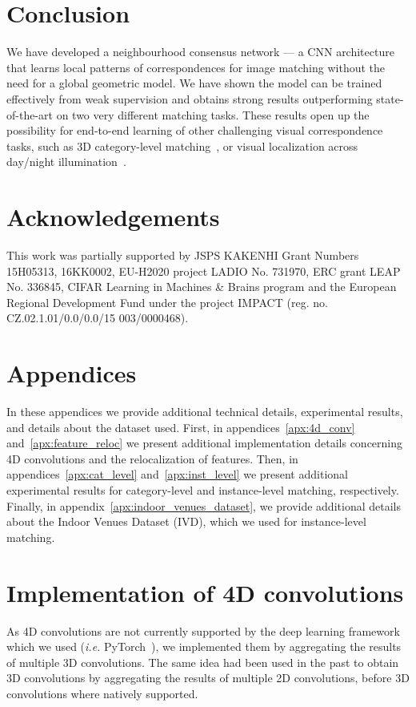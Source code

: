 \documentclass{article}
\begin{document}
\section{Conclusion}
We have developed a neighbourhood consensus network — a CNN architecture  that learns local patterns of correspondences for image matching without the need for a global geometric model. We have shown the model can be trained effectively from weak supervision and obtains strong results outperforming state-of-the-art on two very different matching tasks.  These results open up the possibility for end-to-end learning of other challenging visual correspondence tasks, such as 3D category-level matching~\cite{Kanazawa18}, or visual localization across day/night illumination~\cite{Sattler18}.  

\section*{Acknowledgements}

This work was partially supported by
JSPS KAKENHI Grant Numbers 15H05313, 16KK0002, EU-H2020 project LADIO No. 731970, ERC
grant LEAP No. 336845, CIFAR Learning in Machines
\& Brains program and the European Regional
Development Fund under the project IMPACT (reg.
no. CZ.02.1.01/0.0/0.0/15 003/0000468). 




\clearpage
\appendix
\section*{{\Large Appendices}}
In these appendices we provide additional technical details, experimental results, and details about the dataset used. First, in appendices~\ref{apx:4d_conv} and~\ref{apx:feature_reloc} we present additional implementation details concerning 4D convolutions and the relocalization of features. Then, in appendices~\ref{apx:cat_level} and~\ref{apx:inst_level} we present additional experimental results for category-level and instance-level matching, respectively. Finally, in appendix~\ref{apx:indoor_venues_dataset}, we provide additional details about the Indoor Venues Dataset (IVD), which we used for instance-level matching.
\section{Implementation of 4D convolutions \label{apx:4d_conv}}
As 4D convolutions are not currently supported by the deep learning framework which we used (\emph{i.e.} PyTorch~\cite{pytorch}), we implemented them by aggregating the results of multiple 3D convolutions. The same idea had been used in the past to obtain 3D convolutions by aggregating the results of multiple 2D convolutions, before 3D convolutions where natively supported.
\end{document}
